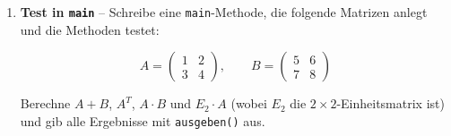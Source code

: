\documentclass[
	fontsize=12pt,          %
	paper=a4,               %
	numbers=noenddot,       %
	listof=totoc,           %
	listof=entryprefix,     %
	listof=nochaptergap,    %
	bibliography=totoc,     %
	parskip=half            %
	openany                 %
]{scrbook}
\begin{document}
\begin{enumerate}[label=\textbf{\alph*)}]
\begin{lstlisting}
static int[][] einheitsmatrix(int n)
\end{lstlisting}

\item \textbf{Test in \texttt{main}} -- Schreibe eine \texttt{main}-Methode, die folgende Matrizen anlegt und die Methoden testet:

\[
	A = \begin{pmatrix} 1 & 2 \\ 3 & 4 \end{pmatrix}, \qquad
	B = \begin{pmatrix} 5 & 6 \\ 7 & 8 \end{pmatrix}
\]

Berechne $A + B$, $A^T$, $A \cdot B$ und $E_2 \cdot A$ (wobei $E_2$ die $2\times2$-Einheitsmatrix ist) und gib alle Ergebnisse mit \texttt{ausgeben()} aus.

\end{enumerate}
\end{document}
